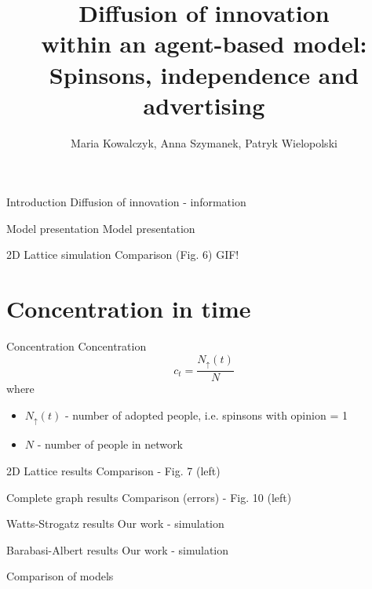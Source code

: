 \documentclass[10pt]{beamer}
\title{Diffusion of innovation \\ within an agent-based model: \\ Spinsons, independence and advertising}
\author{Maria Kowalczyk, Anna Szymanek, Patryk Wielopolski}
\institute{Wrocław Univeristy of Technology and Science}
\date{}
\begin{document}
\maketitle

\begin{frame}{Introduction}
	Diffusion of innovation - information
\end{frame}{}

\begin{frame}{Model presentation}
	Model presentation
\end{frame}

\begin{frame}{2D Lattice simulation}
	Comparison (Fig. 6)
	GIF!
\end{frame}

\section{Concentration in time}

\begin{frame}{Concentration}
	Concentration
	$$ c_t = \frac{N_{\uparrow}(t)}{N} $$ 
	where 
	\begin{itemize}
		\item $ N_{\uparrow}(t) $ - number of adopted people, i.e. spinsons with opinion = 1
		\item $ N $ - number of people in network
	\end{itemize}

\end{frame}

\begin{frame}{2D Lattice results}
	Comparison - Fig. 7 (left)
\end{frame}

\begin{frame}{Complete graph results}
	Comparison (errors) - Fig. 10 (left)
\end{frame}

\begin{frame}{Watts-Strogatz results}
	Our work - simulation
\end{frame}

\begin{frame}{Barabasi-Albert results}
	Our work - simulation
\end{frame}

\begin{frame}{Comparison of models}
	
\end{frame}
\end{document}
